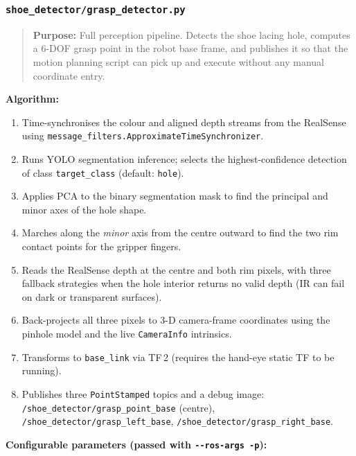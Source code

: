 \documentclass[11pt,a4paper]{article}
\newcommand{\file}[1]{\texttt{#1}}
\newcommand{\topic}[1]{\texttt{\small #1}}
\newenvironment{filebox}{%
  \par\vspace{0.3em}\begin{quote}\itshape
}{%
  \end{quote}\vspace{0.3em}%
}
\begin{document}
\subsubsection{\file{shoe\_detector/grasp\_detector.py}}

\begin{filebox}
\textbf{Purpose:} Full perception pipeline. Detects the shoe lacing hole,
computes a 6-DOF grasp point in the robot base frame, and publishes it so
that the motion planning script can pick up and execute without any manual
coordinate entry.
\end{filebox}

\textbf{Algorithm:}
\begin{enumerate}
  \item Time-synchronises the colour and aligned depth streams from the
        RealSense using \texttt{message\_filters.ApproximateTimeSynchronizer}.
  \item Runs YOLO segmentation inference; selects the highest-confidence
        detection of class \texttt{target\_class} (default: \texttt{hole}).
  \item Applies PCA to the binary segmentation mask to find the principal
        and minor axes of the hole shape.
  \item Marches along the \emph{minor} axis from the centre outward to find
        the two rim contact points for the gripper fingers.
  \item Reads the RealSense depth at the centre and both rim pixels, with
        three fallback strategies when the hole interior returns no valid
        depth (IR can fail on dark or transparent surfaces).
  \item Back-projects all three pixels to 3-D camera-frame coordinates using
        the pinhole model and the live \texttt{CameraInfo} intrinsics.
  \item Transforms to \texttt{base\_link} via TF\,2 (requires the hand-eye
        static TF to be running).
  \item Publishes three \texttt{PointStamped} topics and a debug image:
        \topic{/shoe\_detector/grasp\_point\_base} (centre),
        \topic{/shoe\_detector/grasp\_left\_base},
        \topic{/shoe\_detector/grasp\_right\_base}.
\end{enumerate}

\textbf{Configurable parameters (passed with \texttt{-{}-ros-args -p}):}
\end{document}
